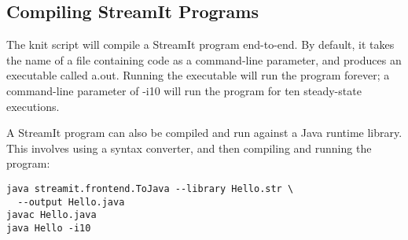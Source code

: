 \subsection{Compiling StreamIt Programs}

The \textsf{knit} script will compile a StreamIt program end-to-end.
By default, it takes the name of a file containing code as a
command-line parameter, and produces an executable called
\textsf{a.out}.  Running the executable will run the program forever;
a command-line parameter of \textsf{-i10} will run the program for ten
steady-state executions.

A StreamIt program can also be compiled and run against a Java runtime
library.  This involves using a syntax converter, and then compiling
and running the program:

\begin{verbatim}
java streamit.frontend.ToJava --library Hello.str \
  --output Hello.java
javac Hello.java
java Hello -i10
\end{verbatim}